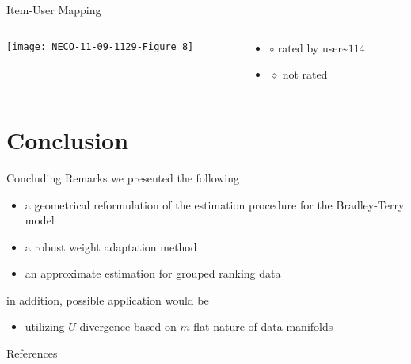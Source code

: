 \documentclass[fleqn,aspectratio=1610]{beamer}
\begin{document}
\begin{frame}[label={sec:org916c776}]{Item-User Mapping}
\begin{columns}
\begin{column}{0.6\columnwidth}
\begin{center}
  \texttt{[image: NECO-11-09-1129-Figure\_8]}%
\end{center}
\end{column}
\begin{column}{0.4\columnwidth}
\begin{itemize}
\item \(\circ\) rated by user\textasciitilde{}\(114\)
\item \(\diamond\) not rated
\end{itemize}
\end{column}
\end{columns}
\end{frame}


\section{Conclusion}
\label{sec:org44c9e3c}
\begin{frame}[label={sec:org4d493c4}]{Concluding Remarks}
we presented the following
\begin{itemize}
\item a geometrical reformulation of the estimation procedure 
for the Bradley-Terry model
\item a robust weight adaptation method
\item an approximate estimation for grouped ranking data
\end{itemize}

in addition, possible application would be
\begin{itemize}
\item utilizing \(U\)-divergence based on \(m\)-flat nature of data
manifolds
\end{itemize}
\end{frame}

\begin{frame}[allowframebreaks]{References}
\printbibliography[heading=none]
\end{frame}
\end{document}
